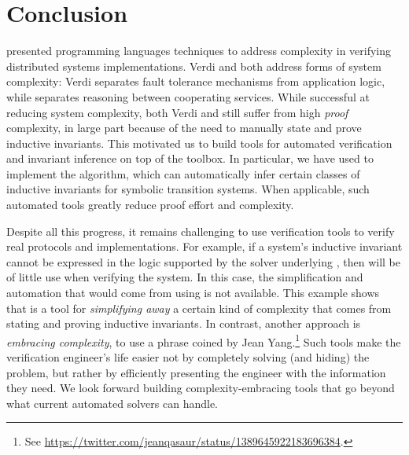 \chapter{Conclusion}
\label{chap:conclusion}

 presented programming languages techniques
  to address complexity in verifying distributed systems implementations.
Verdi and \disel both address forms of system complexity:
  Verdi separates fault tolerance mechanisms from application logic,
  while \disel separates reasoning between cooperating services.
While successful at reducing system complexity,
  both Verdi and \disel still suffer from high \emph{proof} complexity,
  in large part because of the need to manually state and prove inductive invariants.
This motivated us to build tools for automated verification and invariant inference
  on top of the \mypyvy toolbox.
In particular, we have used \mypyvy to implement the \updr algorithm,
  which can automatically infer certain classes of inductive invariants
  for symbolic transition systems.
When applicable, such automated tools greatly reduce proof effort and complexity.

Despite all this progress, it remains challenging to use verification tools
  to verify real protocols and implementations.
For example, if a system's inductive invariant cannot be expressed
  in the logic supported by the solver underlying \mypyvy,
  then \mypyvy will be of little use when verifying the system.
In this case, the simplification and automation that would come from using \mypyvy is not available.
This example shows that \mypyvy is
  a tool for \emph{simplifying away} a certain kind of complexity
  that comes from stating and proving inductive invariants.
In contrast, another approach is \emph{embracing complexity},
  to use a phrase coined by Jean Yang.\footnote{See \url{https://twitter.com/jeanqasaur/status/1389645922183696384}.}
Such tools make the verification engineer's life easier not by completely solving (and hiding) the problem,
  but rather by efficiently presenting the engineer with the information they need.
We look forward building complexity-embracing tools that go beyond what current automated solvers can handle.
